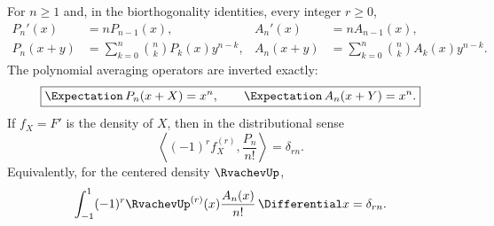 \begin{proposition}
\label{is:p2:prop:Appell-package}
For $n\ge1$ and, in the biorthogonality identities, every integer $r\ge0$,
\begin{align}
 P_n'(x)&=nP_{n-1}(x),
 &A_n'(x)&=nA_{n-1}(x),
 \label{is:p2:eq:Appell-derivative}\\
 P_n(x+y)&=\sum_{k=0}^n\binom nkP_k(x)y^{n-k},
 &A_n(x+y)&=\sum_{k=0}^n\binom nkA_k(x)y^{n-k}.
 \label{is:p2:eq:Appell-translation}
\end{align}
The polynomial averaging operators are inverted exactly:
\begin{equation}
 \boxed{
 \Expectation\,P_n(x+X)=x^n,
 \qquad
 \Expectation\,A_n(x+Y)=x^n.
 }
 \label{is:p2:eq:mean-value-inversion}
\end{equation}
If $f_X=F'$ is the density of $X$, then in the distributional sense
\begin{equation}
 \left\langle(-1)^r f_X^{(r)},\frac{P_n}{n!}\right\rangle=\delta_{rn}.
 \label{is:p2:eq:P-biorthogonal}
\end{equation}
Equivalently, for the centered density $\RvachevUp$,
\begin{equation}
 \int_{-1}^{1}(-1)^r\RvachevUp^{(r)}(x)\frac{A_n(x)}{n!}\,\Differential x
 =\delta_{rn}.
 \label{is:p2:eq:A-biorthogonal}
\end{equation}
\end{proposition}

